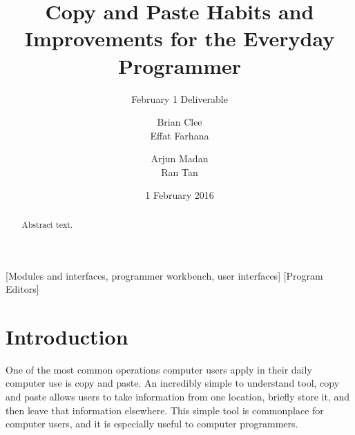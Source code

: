 \documentclass{acm_proc_article-sp}
\begin{document}
\title{Copy and Paste Habits and Improvements for the Everyday Programmer}
\subtitle{February 1 Deliverable}

\author{
\alignauthor
Brian Clee\\
\alignauthor
Effat Farhana\\
\and %
\alignauthor
Arjun Madan\\
\alignauthor
Ran Tan\\
}

\date{1 February 2016}


\maketitle
\begin{abstract}
Abstract text. 
\end{abstract}

[Modules and interfaces, programmer workbench, user interfaces]
[Program Editors]



\section{Introduction}
One of the most common operations computer users apply in their daily computer use is copy and paste. An incredibly simple to understand tool, copy and paste allows users to take information from one location, briefly store it, and then leave that information elsewhere. This simple tool is commonplace for computer users, and it is especially useful to computer programmers. 
\end{document}

